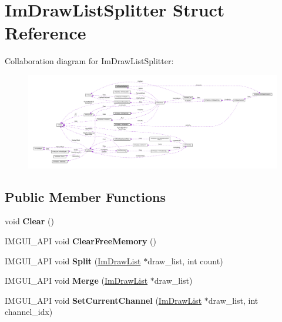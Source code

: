 \hypertarget{structImDrawListSplitter}{}\section{Im\+Draw\+List\+Splitter Struct Reference}
\label{structImDrawListSplitter}


Collaboration diagram for Im\+Draw\+List\+Splitter\+:\nopagebreak
\begin{figure}[H]
\begin{center}
\leavevmode
\includegraphics[width=350pt]{structImDrawListSplitter__coll__graph}
\end{center}
\end{figure}
\subsection*{Public Member Functions}
\begin{DoxyCompactItemize}
\item 
\mbox{\label{structImDrawListSplitter_ac6865e5a2f180419fa282b681bf08c9c}} 
void {\bfseries Clear} ()
\item 
\mbox{\label{structImDrawListSplitter_a95dbdaa7ea2a0328a85732ed210a549b}} 
I\+M\+G\+U\+I\+\_\+\+A\+PI void {\bfseries Clear\+Free\+Memory} ()
\item 
\mbox{\label{structImDrawListSplitter_aa491c5b1e10b2f5340e7db4949d31255}} 
I\+M\+G\+U\+I\+\_\+\+A\+PI void {\bfseries Split} (\hyperlink{structImDrawList}{Im\+Draw\+List} $\ast$draw\+\_\+list, int count)
\item 
\mbox{\label{structImDrawListSplitter_af3fc4bad2abca9e481d476d1877ba5be}} 
I\+M\+G\+U\+I\+\_\+\+A\+PI void {\bfseries Merge} (\hyperlink{structImDrawList}{Im\+Draw\+List} $\ast$draw\+\_\+list)
\item 
\mbox{\label{structImDrawListSplitter_ad3797b0755caa07f3d69a9e3566eb0e5}} 
I\+M\+G\+U\+I\+\_\+\+A\+PI void {\bfseries Set\+Current\+Channel} (\hyperlink{structImDrawList}{Im\+Draw\+List} $\ast$draw\+\_\+list, int channel\+\_\+idx)
\end{DoxyCompactItemize}
